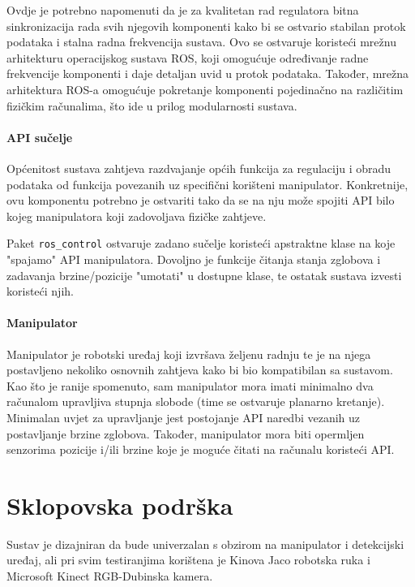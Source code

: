 \documentclass[times, utf8, diplomski, numeric]{fer}
\begin{document}
Ovdje je potrebno napomenuti da je za kvalitetan rad regulatora bitna sinkronizacija rada svih njegovih komponenti kako bi se ostvario stabilan protok podataka i stalna radna frekvencija sustava.
Ovo se ostvaruje koristeći mrežnu arhitekturu operacijskog sustava ROS, koji omogućuje određivanje radne frekvencije komponenti i daje detaljan uvid u protok podataka.
Također, mrežna arhitektura ROS-a omogućuje pokretanje komponenti pojedinačno na različitim fizičkim računalima, što ide u prilog modularnosti sustava.

\subsubsection{API sučelje}
Općenitost sustava zahtjeva razdvajanje općih funkcija za regulaciju i obradu podataka od funkcija povezanih uz specifični korišteni manipulator.
Konkretnije, ovu komponentu potrebno je ostvariti tako da se na nju može spojiti API bilo kojeg manipulatora koji zadovoljava fizičke zahtjeve.

Paket \texttt{ros\_control} ostvaruje zadano sučelje koristeći apstraktne klase na koje "spajamo" API manipulatora.
Dovoljno je funkcije čitanja stanja zglobova i zadavanja brzine/pozicije "umotati" u dostupne klase, te ostatak sustava izvesti koristeći njih.

\subsubsection{Manipulator}
Manipulator je robotski uređaj koji izvršava željenu radnju te je na njega postavljeno nekoliko osnovnih zahtjeva kako bi bio kompatibilan sa sustavom.
Kao što je ranije spomenuto, sam manipulator mora imati minimalno dva računalom upravljiva stupnja slobode (time se ostvaruje planarno kretanje).
Minimalan uvjet za upravljanje jest postojanje API naredbi vezanih uz postavljanje brzine zglobova.
Također, manipulator mora biti opermljen senzorima pozicije i/ili brzine koje je moguće čitati na računalu koristeći API.


\chapter{Sklopovska podrška}
Sustav je dizajniran da bude univerzalan s obzirom na manipulator i detekcijski uređaj, ali pri svim testiranjima korištena je Kinova Jaco robotska ruka i Microsoft Kinect RGB-Dubinska kamera.
\end{document}
